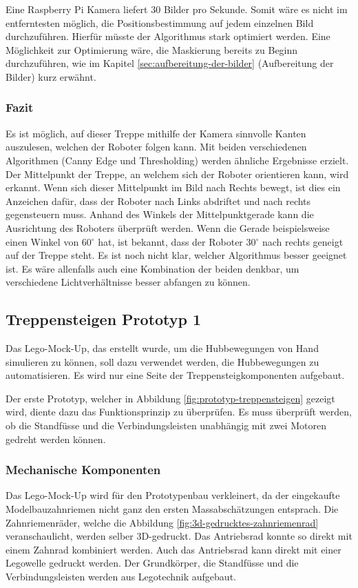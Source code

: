 Eine Raspberry Pi Kamera liefert 30 Bilder pro Sekunde. Somit wäre es nicht im entferntesten möglich, die Positionsbestimmung auf jedem einzelnen Bild durchzuführen. Hierfür müsste der Algorithmus stark optimiert werden. Eine Möglichkeit zur Optimierung wäre, die Maskierung bereits zu Beginn durchzuführen, wie im Kapitel \ref{sec:aufbereitung-der-bilder} (Aufbereitung der Bilder) kurz erwähnt.
  
\subsubsection{Fazit}
Es ist möglich, auf dieser Treppe mithilfe der Kamera sinnvolle Kanten auszulesen, welchen der Roboter folgen kann. Mit beiden verschiedenen Algorithmen (Canny Edge und Thresholding) werden ähnliche Ergebnisse erzielt. Der Mittelpunkt der Treppe, an welchem sich der Roboter orientieren kann, wird erkannt. Wenn sich dieser Mittelpunkt im Bild nach Rechts bewegt, ist dies ein Anzeichen dafür, dass der Roboter nach Links abdriftet und nach rechts gegensteuern muss. Anhand des Winkels der Mittelpunktgerade kann die Ausrichtung des Roboters überprüft werden. Wenn die Gerade beispielsweise einen Winkel von 60$^\circ$
 hat, ist bekannt, dass der Roboter 30$^\circ$ nach rechts geneigt auf der Treppe steht.
Es ist noch nicht klar, welcher Algorithmus besser geeignet ist. Es wäre allenfalls auch eine Kombination der beiden denkbar, um verschiedene Lichtverhältnisse besser abfangen zu können.

\newpage
\subsection{Treppensteigen Prototyp 1}
Das Lego-Mock-Up, das erstellt wurde, um die Hubbewegungen von Hand simulieren zu können, soll dazu verwendet werden, die Hubbewegungen zu automatisieren. Es wird nur eine Seite der Treppensteigkomponenten aufgebaut. 

Der erste Prototyp, welcher in Abbildung \ref{fig:prototyp-treppensteigen} gezeigt wird, diente dazu das Funktionsprinzip zu überprüfen. Es muss überprüft werden, ob die Standfüsse und die Verbindungsleisten unabhängig mit zwei Motoren gedreht werden können. 

\subsubsection{Mechanische Komponenten}
Das Lego-Mock-Up wird für den Prototypenbau verkleinert, da der eingekaufte Modelbauzahnriemen nicht ganz den ersten Massabschätzungen entsprach. Die Zahnriemenräder, welche die Abbildung \ref{fig:3d-gedrucktes-zahnriemenrad} veranschaulicht, werden selber 3D-gedruckt. Das Antriebsrad konnte so direkt mit einem Zahnrad kombiniert werden. Auch das Antriebsrad kann direkt mit einer Legowelle gedruckt werden. Der Grundkörper, die Standfüsse und die Verbindungsleisten werden aus Legotechnik aufgebaut.\\

